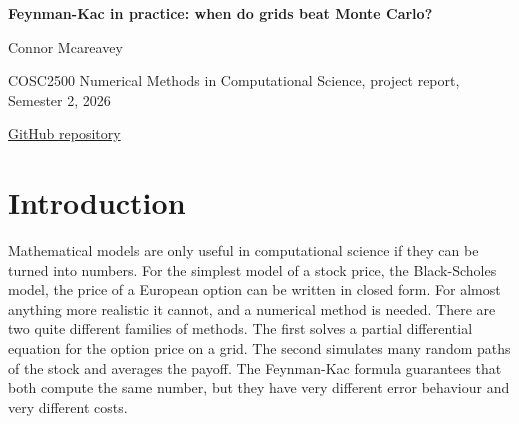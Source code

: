 \documentclass[11pt,a4paper]{article}
\begin{document}
\begin{center}
{\LARGE\bfseries Feynman-Kac in practice: when do grids beat Monte Carlo?\par}
\vspace{0.8em}
{\large Connor Mcareavey\par}
\vspace{0.3em}
COSC2500 Numerical Methods in Computational Science, project report, Semester 2, 2026\par
\vspace{0.3em}
\href{https://github.com/ConnorMcareavey/feynman-kac-option-pricing}{GitHub repository}
\end{center}

\begin{abstract}
\noindent The price of a European option in the Black-Scholes model is both the solution of a parabolic partial differential equation and an expectation over random stock price paths, a duality expressed by the Feynman-Kac formula. We use this to compare grid methods and Monte Carlo methods on problems with exact answers, so that every error reported is a true error. For the PDE we reduce the Black-Scholes equation to the heat equation and compare the explicit, implicit and Crank-Nicolson schemes. With practical time steps Crank-Nicolson fails to converge for a digital option, and we find that the standard two step Rannacher start-up restores the price but not the gamma, which needs four steps. For Monte Carlo we separate the statistical error from the Euler-Maruyama bias using coupled simulations. We then derive and measure how both approaches scale with the number of underlying assets, and find a crossover at about four to five dimensions for tensor product quadrature and about three for a time stepping PDE solver. An extension prices baskets of up to 20 correlated stocks, where a geometric basket control variate reduces the variance by factors of 25 to over 2000.
\end{abstract}

\section{Introduction}

Mathematical models are only useful in computational science if they can be turned into numbers. For the simplest model of a stock price, the Black-Scholes model, the price of a European option can be written in closed form. For almost anything more realistic it cannot, and a numerical method is needed. There are two quite different families of methods. The first solves a partial differential equation for the option price on a grid. The second simulates many random paths of the stock and averages the payoff. The Feynman-Kac formula guarantees that both compute the same number, but they have very different error behaviour and very different costs.
\end{document}
